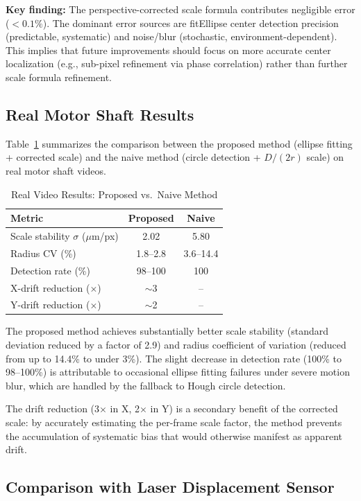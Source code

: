 \documentclass[journal]{IEEEtran}
\begin{document}
\textbf{Key finding:} The perspective-corrected scale formula contributes
negligible error ($< 0.1\%$). The dominant error sources are fitEllipse
center detection precision (predictable, systematic) and noise/blur
(stochastic, environment-dependent). This implies that future improvements
should focus on more accurate center localization (e.g., sub-pixel refinement
via phase correlation) rather than further scale formula refinement.

\subsection{Real Motor Shaft Results}

Table~\ref{tab:real} summarizes the comparison between the proposed method
(ellipse fitting + corrected scale) and the naive method (circle detection +
$D/(2r)$ scale) on real motor shaft videos.

\begin{table}[!t]
\centering
\caption{Real Video Results: Proposed vs.\ Naive Method}
\label{tab:real}
\begin{tabular}{lcc}
\toprule
Metric & Proposed & Naive \\
\midrule
Scale stability $\sigma$ ($\mu$m/px) & 2.02 & 5.80 \\
Radius CV (\%) & 1.8--2.8 & 3.6--14.4 \\
Detection rate (\%) & 98--100 & 100 \\
X-drift reduction ($\times$) & $\sim$3 & -- \\
Y-drift reduction ($\times$) & $\sim$2 & -- \\
\bottomrule
\end{tabular}
\end{table}

The proposed method achieves substantially better scale stability (standard
deviation reduced by a factor of 2.9) and radius coefficient of variation
(reduced from up to 14.4\% to under 3\%). The slight decrease in detection
rate (100\% to 98--100\%) is attributable to occasional ellipse fitting
failures under severe motion blur, which are handled by the fallback to
Hough circle detection.

The drift reduction (3$\times$ in X, 2$\times$ in Y) is a secondary benefit
of the corrected scale: by accurately estimating the per-frame scale factor,
the method prevents the accumulation of systematic bias that would otherwise
manifest as apparent drift.

\subsection{Comparison with Laser Displacement Sensor}
\end{document}
